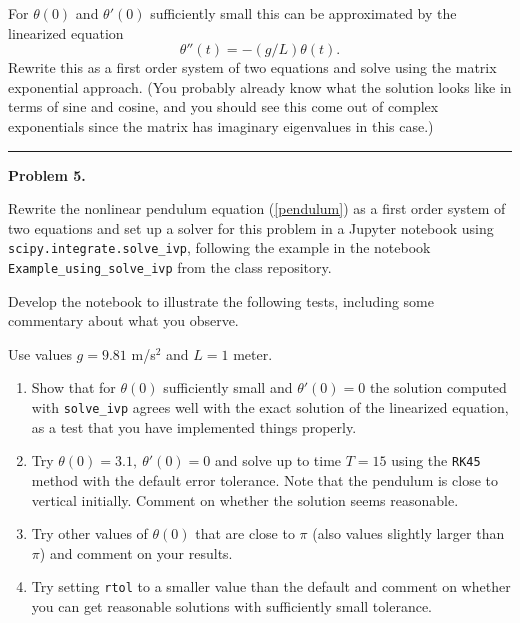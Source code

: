 \documentclass[10pt]{article}
\begin{document}
For $\theta(0)$ and $\theta'(0)$ sufficiently small this can be approximated
by the linearized equation
\[
\theta''(t) = -(g/L)\theta(t).
\]
Rewrite this as a first order system of two equations and solve using the
matrix exponential approach.  (You probably already know what the solution
looks like in terms of sine and cosine, and you should see this come out of
complex exponentials since the matrix has imaginary eigenvalues in this case.)




\vskip 1cm
\hrule
{\bf Problem 5.}

Rewrite the nonlinear pendulum equation (\ref{pendulum}) 
as a first order system of two equations and set up a solver
for this problem in a Jupyter notebook using {\tt scipy.integrate.solve\_ivp}, 
following the example in the notebook {\tt Example\_using\_solve\_ivp} from the
class repository.  

Develop the notebook to illustrate the following tests, 
including some commentary about what you observe.  

Use values $g = 9.81$ m/s$^2$ and $L = 1$ meter.

\begin{enumerate}
\item Show that for $\theta(0)$ sufficiently small and $\theta'(0)=0$ the 
solution computed with {\tt solve\_ivp} agrees well with the exact solution of
the linearized equation, as a test that you have implemented things properly.

\item Try $\theta(0) = 3.1,~ \theta'(0) = 0$ and solve up to time $T = 15$
using the {\tt RK45} method with the default error tolerance.  Note that the
pendulum is close to vertical initially.  Comment on whether the solution
seems reasonable.

\item Try other values of $\theta(0)$ that are close to $\pi$ (also 
values slightly larger than $\pi$) and comment on your results.

\item Try setting {\tt rtol} to a smaller value than the default and comment
on whether you can get reasonable solutions with sufficiently small tolerance.
 
\end{enumerate}
\end{document}

